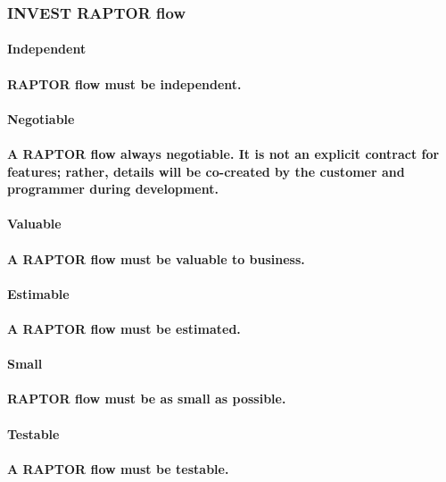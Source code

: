 \documentclass{acm_proc_article-sp}
\begin{document}
\subsubsection{INVEST RAPTOR flow}
\paragraph{Independent}
\paragraph{RAPTOR flow must be independent.}
\paragraph{Negotiable}
\paragraph{A RAPTOR flow always negotiable. It is not an explicit contract for features; rather, details will be co-created by the customer and programmer during development.}
\paragraph{Valuable}
\paragraph{A RAPTOR flow must be valuable to business.}
\paragraph{Estimable}
\paragraph{A RAPTOR flow must be estimated.}
\paragraph{Small}
\paragraph{RAPTOR flow must be as small as possible.}
\paragraph{Testable}
\paragraph{A RAPTOR flow must be testable.}
\end{document}
